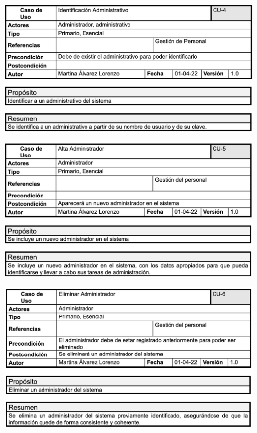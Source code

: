 \documentclass[12pt, spanish]{article}
\begin{document}
\begin{centering}\includegraphics[scale = 0.70]{casos_de_uso/4.png}\\[1.0 cm]\end{centering}
\begin{centering}\includegraphics[scale = 0.70]{casos_de_uso/5.png}\\[1.0 cm]\end{centering}
\begin{centering}\includegraphics[scale = 0.70]{casos_de_uso/6.png}\\[1.0 cm]\end{centering}
\end{document}
